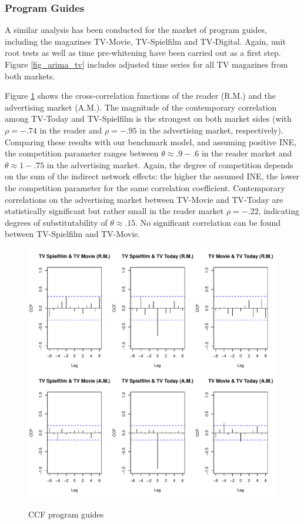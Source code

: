 \documentclass[12pt,a4paper,notitlepage]{article}
\begin{document}
\subsubsection{Program Guides}

A similar analysis has been conducted for the market of program guides, including the magazines TV-Movie, TV-Spielfilm and TV-Digital. 
Again, unit root tests as well as time pre-whitening have been carried out as a first step. Figure \ref{fig_arima_tv} includes adjusted time series for all TV magazines from both markets.  

Figure \ref{fig_ccf_tv} shows the cross-correlation functions of the reader (R.M.) and the advertising market (A.M.). The magnitude of the contemporary correlation among TV-Today and TV-Spielfilm is the strongest on both market sides (with $\rho=-.74$ in the reader and $\rho=-.95$ in the advertising market, respectively). Comparing these results with our benchmark model, and assuming positive INE, the competition parameter ranges between $\theta\approx.9-.6$ in the reader market and $\theta\approx1-.75$ in the advertising market. Again, the degree of competition depends on the sum of the indirect network effects: the higher the assumed INE, the lower the competition parameter for the same correlation coefficient. Contemporary correlations on the advertising market between TV-Movie and TV-Today are statistically significant but rather small in the reader market $\rho=-.22$, indicating degrees of substitutability of $\theta\approx.15$. No significant correlation can be found between TV-Spielfilm and TV-Movie.

\begin{figure}[H]
\caption{CCF program guides}
	\centering
	\includegraphics[scale=0.5]{../figs/ccf_tv}
	\label{fig_ccf_tv}
\end{figure}
\end{document}
